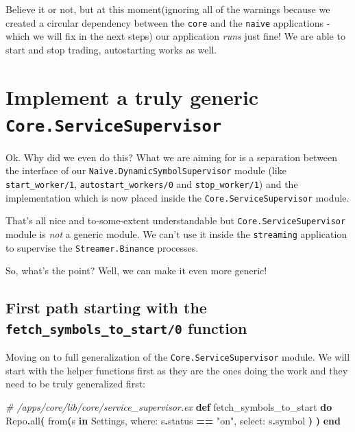 \documentclass[
  oneside]{book}
\newenvironment{Shaded}{\begin{snugshade}}{\end{snugshade}}
\newcommand{\CommentTok}[1]{\textcolor[rgb]{0.56,0.35,0.01}{\textit{#1}}}
\newcommand{\ConstantTok}[1]{\textcolor[rgb]{0.56,0.35,0.01}{#1}}
\newcommand{\FunctionTok}[1]{\textcolor[rgb]{0.13,0.29,0.53}{\textbf{#1}}}
\newcommand{\KeywordTok}[1]{\textcolor[rgb]{0.13,0.29,0.53}{\textbf{#1}}}
\newcommand{\NormalTok}[1]{#1}
\newcommand{\OperatorTok}[1]{\textcolor[rgb]{0.81,0.36,0.00}{\textbf{#1}}}
\newcommand{\StringTok}[1]{\textcolor[rgb]{0.31,0.60,0.02}{#1}}
\newcommand{\VariableTok}[1]{\textcolor[rgb]{0.00,0.00,0.00}{#1}}
\begin{document}
Believe it or not, but at this moment(ignoring all of the warnings because we created a circular dependency between the \texttt{core} and the \texttt{naive} applications - which we will fix in the next steps) our application \emph{runs} just fine! We are able to start and stop trading, autostarting works as well.

\section{\texorpdfstring{Implement a truly generic \texttt{Core.ServiceSupervisor}}{Implement a truly generic Core.ServiceSupervisor}}\label{implement-a-truly-generic-core.servicesupervisor}

Ok. Why did we even do this? What we are aiming for is a separation between the interface of our \texttt{Naive.DynamicSymbolSupervisor} module (like \texttt{start\_worker/1}, \texttt{autostart\_workers/0} and \texttt{stop\_worker/1}) and the implementation which is now placed inside the \texttt{Core.ServiceSupervisor} module.

That's all nice and to-some-extent understandable but \texttt{Core.ServiceSupervisor} module is \emph{not} a generic module. We can't use it inside the \texttt{streaming} application to supervise the \texttt{Streamer.Binance} processes.

So, what's the point? Well, we can make it even more generic!

\subsection{\texorpdfstring{First path starting with the \texttt{fetch\_symbols\_to\_start/0} function}{First path starting with the fetch\_symbols\_to\_start/0 function}}\label{first-path-starting-with-the-fetch_symbols_to_start0-function}

Moving on to full generalization of the \texttt{Core.ServiceSupervisor} module. We will start with the helper functions first as they are the ones doing the work and they need to be truly generalized first:

\begin{Shaded}
\begin{Highlighting}[]
  \CommentTok{\# /apps/core/lib/core/service\_supervisor.ex}
  \KeywordTok{def}\NormalTok{ fetch\_symbols\_to\_start }\KeywordTok{do}
    \ConstantTok{Repo}\OperatorTok{.}\NormalTok{all}\FunctionTok{(}
\NormalTok{      from}\FunctionTok{(}\NormalTok{s }\KeywordTok{in} \ConstantTok{Settings}\NormalTok{,}
        \VariableTok{where:}\NormalTok{ s}\OperatorTok{.}\NormalTok{status }\OperatorTok{==} \StringTok{"on"}\NormalTok{,}
        \VariableTok{select:}\NormalTok{ s}\OperatorTok{.}\NormalTok{symbol}
      \FunctionTok{)}
    \FunctionTok{)}
  \KeywordTok{end}
\end{Highlighting}
\end{Shaded}
\end{document}
